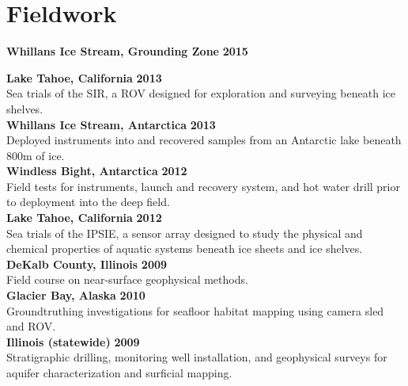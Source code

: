\section{Fieldwork} 
\textbf{Whillans Ice Stream, Grounding Zone} \hfill \textbf{2015}

\textbf{Lake Tahoe, California} \hfill \textbf{2013}\\
Sea trials of the SIR, a ROV designed for exploration and surveying beneath ice shelves.\\

\textbf{Whillans Ice Stream, Antarctica} \hfill \textbf{2013}\\
Deployed instruments into and recovered samples from an Antarctic lake beneath 800m of ice.\\

\textbf{Windless Bight, Antarctica} \hfill \textbf{2012}\\
Field tests for instruments, launch and recovery system, and hot water drill prior to deployment into the deep field.\\

 \textbf{Lake Tahoe, California} \hfill \textbf{2012}\\
Sea trials of the IPSIE, a sensor array designed to study the physical and chemical properties of aquatic systems beneath ice sheets and ice shelves.\\

\textbf{DeKalb County, Illinois} \hfill \textbf{2009}\\
Field course on near-surface geophysical methods.\\

\textbf{Glacier Bay, Alaska} \hfill \textbf{2010}\\
Groundtruthing investigations for seafloor habitat mapping using camera sled and ROV.\\

\textbf{Illinois (statewide)} \hfill \textbf{2009}\\
Stratigraphic drilling, monitoring well installation, and geophysical surveys for aquifer characterization and surficial mapping. \\
